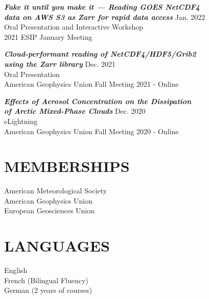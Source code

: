 \documentclass[overlapped]{res}
\begin{document}
\begin{resume}
                {\sl \textbf{Fake it until you make it — Reading GOES NetCDF4 \\ data on AWS S3 as Zarr for rapid data access }} \hfill Jan. 2022 \\
                Oral Presentation and Interactive Workshop\\
                2021 ESIP January Meeting

                {\sl \textbf{Cloud-performant reading of NetCDF4/HDF5/Grib2\\ using the Zarr library}} \hfill Dec. 2021 \\
                Oral Presentation \\
                American Geophysics Union Fall Meeting 2021 - Online

                {\sl \textbf{Effects of Aerosol Concentration  on the Dissipation \\ of Arctic Mixed-Phase Clouds}} \hfill Dec. 2020 \\ 
                eLightning \\
                American Geophysics Union Fall Meeting 2020 - Online
                

                

\section{MEMBERSHIPS}            
                {American Meteorological Society} \\
                {American Geophysics Union} \\
                {European Geosciences Union}

\section{LANGUAGES}
                English \\
                French (Bilingual Fluency) \\
                German (2 years of courses) 

\end{resume}
\end{document}
